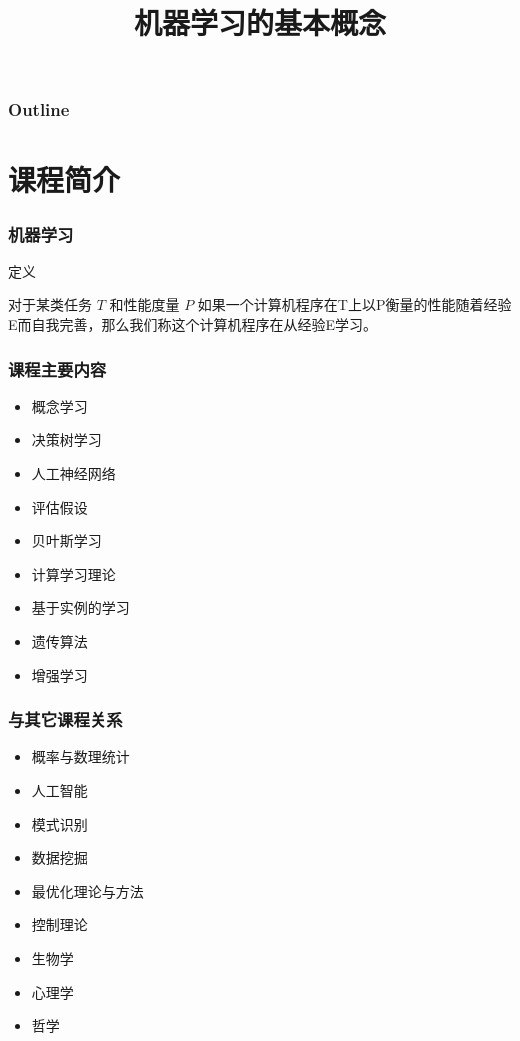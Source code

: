 \documentclass{beamer}
\title{机器学习的基本概念}
\author{}
\date{}
\begin{document}
\maketitle

\begin{frame}
\frametitle{Outline}
\setcounter{tocdepth}{3}
\tableofcontents
\end{frame}













\section{课程简介}
\label{sec-1}
\begin{frame}
\frametitle{机器学习}
\label{sec-1-1}
\begin{block}{定义}
\label{sec-1-1-1}

 对于某类任务 $T$ 和性能度量 $P$ 如果一个计算机程序在T上以P衡量的性能随着经验E而自我完善，那么我们称这个计算机程序在从经验E学习。
\end{block}
\end{frame}
\begin{frame}
\frametitle{课程主要内容}
\label{sec-1-2}


\begin{itemize}
\item 概念学习
\item 决策树学习
\item 人工神经网络
\item 评估假设
\item 贝叶斯学习
\item 计算学习理论
\item 基于实例的学习
\item 遗传算法
\item 增强学习
\end{itemize}
\end{frame}
\begin{frame}
\frametitle{与其它课程关系}
\label{sec-1-3}


\begin{itemize}
\item 概率与数理统计
\item 人工智能
\item 模式识别
\item 数据挖掘
\item 最优化理论与方法
\item 控制理论
\item 生物学
\item 心理学
\item 哲学
\end{itemize}
\end{frame}
\end{document}
